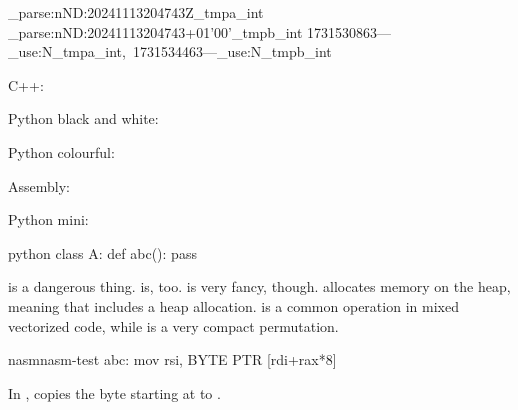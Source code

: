 \documentclass{article}
\def\TimeTest{%
  \unixtime_parse:nN{D:20241113204743Z}\g_tmpa_int%
  \unixtime_parse:nN{D:20241113204743+01'00'}\g_tmpb_int%
  1731530863---\int_use:N\g_tmpa_int,~1731534463---\int_use:N\g_tmpb_int%
}
\begin{document}
\TimeTest{}

C++:

Python black and white:

Python colourful:

Assembly:

Python mini:

\begin{SemCoMiniEnv}{python}
class A:
  def abc(): pass
\end{SemCoMiniEnv}

 is a dangerous thing.
 is, too.
 is very fancy, though.
 allocates memory on the heap, meaning that  includes a heap allocation.
 is a common operation in mixed vectorized code, while  is a very compact permutation.
\begin{SemCoAnalyzeEnv}{nasm}{nasm-test}
abc:
  mov rsi, BYTE PTR [rdi+rax*8]
\end{SemCoAnalyzeEnv}
In ,  copies the byte starting at  to .
\end{document}

